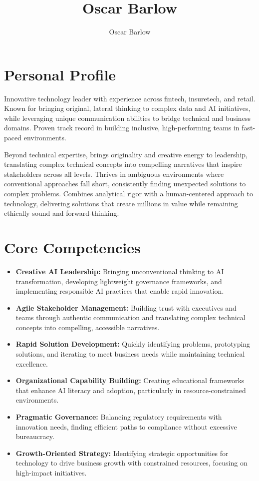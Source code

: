 \documentclass[a4paper]{scrartcl}
\author{Oscar Barlow}
\title{Oscar Barlow}
\date{}
\begin{document}
\maketitle

\section*{Personal Profile}
 { %
  \setlength{\parskip}{6pt plus 2pt minus 1pt}
  Innovative technology leader with experience across fintech, insuretech, and retail. Known for bringing original, lateral thinking to complex data and AI initiatives, while leveraging unique communication abilities to bridge technical and business domains. Proven track record in building inclusive, high-performing teams in fast-paced environments.

  Beyond technical expertise, brings originality and creative energy to leadership, translating complex technical concepts into compelling narratives that inspire stakeholders across all levels. Thrives in ambiguous environments where conventional approaches fall short, consistently finding unexpected solutions to complex problems. Combines analytical rigor with a human-centered approach to technology, delivering solutions that create millions in value while remaining ethically sound and forward-thinking.
 } %

\section*{Core Competencies}
\begin{itemize}
	\item \textbf{Creative AI Leadership:} Bringing unconventional thinking to AI transformation, developing lightweight governance frameworks, and implementing responsible AI practices that enable rapid innovation.
	\item \textbf{Agile Stakeholder Management:} Building trust with executives and teams through authentic communication and translating complex technical concepts into compelling, accessible narratives.
	\item \textbf{Rapid Solution Development:} Quickly identifying problems, prototyping solutions, and iterating to meet business needs while maintaining technical excellence.
	\item \textbf{Organizational Capability Building:} Creating educational frameworks that enhance AI literacy and adoption, particularly in resource-constrained environments.
	\item \textbf{Pragmatic Governance:} Balancing regulatory requirements with innovation needs, finding efficient paths to compliance without excessive bureaucracy.
	\item \textbf{Growth-Oriented Strategy:} Identifying strategic opportunities for technology to drive business growth with constrained resources, focusing on high-impact initiatives.
\end{itemize}
\end{document}
